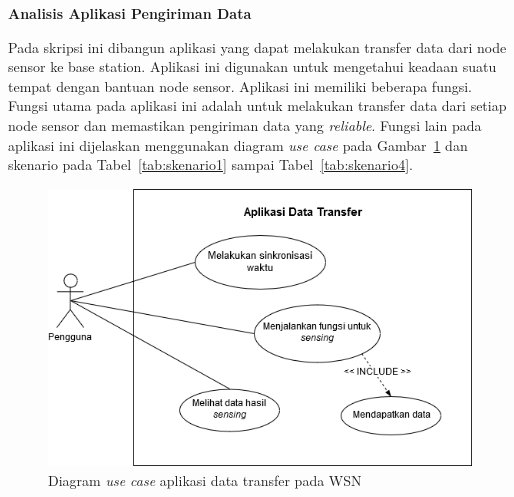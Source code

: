 \documentclass[a4paper,twoside]{article}
\begin{document}
\begin{enumerate}
\textbf{Analisis Aplikasi Pengiriman Data}

Pada skripsi ini dibangun aplikasi yang dapat melakukan transfer data dari node sensor ke base station. Aplikasi ini digunakan untuk mengetahui keadaan suatu tempat dengan bantuan node sensor. Aplikasi ini memiliki beberapa fungsi. Fungsi utama pada aplikasi ini adalah untuk melakukan transfer data dari setiap node sensor dan memastikan pengiriman data yang \textit{reliable}. Fungsi lain pada aplikasi ini dijelaskan menggunakan diagram \textit{use case} pada Gambar~\ref{fig:usecase} dan skenario pada Tabel~\ref{tab:skenario1} sampai Tabel~\ref{tab:skenario4}. 

\begin{figure}[h]
	\centering
	\includegraphics[scale=0.6]{Gambar/usecase}
	\caption{Diagram \textit{use case} aplikasi data transfer pada WSN}
	\label{fig:usecase}
\end{figure}


\end{enumerate}
\end{document}
